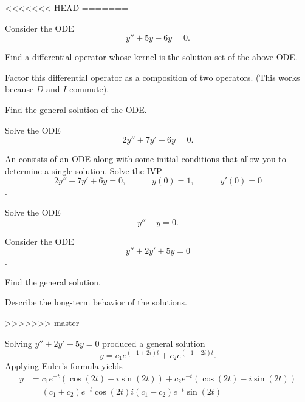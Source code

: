 
\begin{applicationActivities}

<<<<<<< HEAD
=======
\begin{activity}{5}
Consider the ODE \[y''+5y-6y=0.\]
\vfill
\begin{subactivity}
Find a differential operator whose kernel is the solution set of the above ODE.
\end{subactivity}
\begin{subactivity}
Factor this differential operator as a composition of two operators. (This works because \(D\) and \(I\) commute).
\end{subactivity}
\begin{subactivity}
Find the general solution of the ODE.
\end{subactivity}
\end{activity}

\begin{activity}{5}
Solve the ODE \[ 2y''+7y'+6y=0.\]
\end{activity}

\begin{activity}{5}
An  consists of an ODE along with some initial conditions that allow you to determine a single solution.
\vfill
Solve the IVP \[2y''+7y'+6y=0, \hspace{3em} y(0)=1, \hspace{3em} y'(0)=0\].
\end{activity}

\begin{activity}{5}
Solve the ODE \[ y''+y=0.\]
\end{activity}

\begin{activity}{15}
Consider the ODE \[y''+2y'+5y=0\].
\vfill
\begin{subactivity}
Find the general solution.
\end{subactivity}
\begin{subactivity}
Describe the long-term behavior of the solutions.
\end{subactivity}
\end{activity}
>>>>>>> master

\begin{observation}
Solving \(y''+2y'+5y=0\) produced a general solution
\[y=c_1 e^{(-1+2i)t}+c_2 e^{(-1-2i)t}.\]
Applying Euler's formula yields
 \begin{alignat*}{2}
y&=c_1e^{-t} \left(\cos(2t)+i\sin(2t)\right)+c_2 e^{-t} \left(\cos(2t)-i\sin(2t)\right) \\
&=(c_1+c_2)e^{-t} \cos(2t) i(c_1-c_2) e^{-t} \sin(2t)
\end{alignat*}


\end{observation}
\end{applicationActivities}
